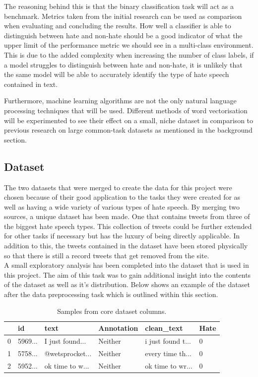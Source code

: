 \documentclass[conference]{IEEEtran}
\begin{document}
The reasoning behind this is that the binary classification task will act as a benchmark. Metrics taken from the initial research can be used as comparison when evaluating and concluding the results. How well a classifier is able to distinguish between hate and non-hate should be a good indicator of what the upper limit of the performance metric we should see in a multi-class environment. This is due to the added complexity when increasing the number of class labels, if a model struggles to distinguish between hate and non-hate, it is unlikely that the same model will be able to accurately identify the type of hate speech contained in text.

Furthermore, machine learning algorithms are not the only natural language processing techniques that will be used. Different methods of word vectorisation will be experimented to see their effect on a small, niche dataset in comparison to previous research on large common-task datasets as mentioned in the background section. 

\subsection{Dataset}
The two datasets that were merged to create the data for this project were chosen because of their good application to the tasks they were created for as well as having a wide variety of various types of hate speech. By merging two sources, a unique dataset has been made. One that contains tweets from three of the biggest hate speech types. This collection of tweets could be further extended for other tasks if necessary but has the luxury of being directly applicable. In addition to this, the tweets contained in the dataset have been stored physically so that there is still a record tweets that get removed from the site. \\

A small exploratory analysis has been completed into the dataset that is used in this project. The aim of this task was to gain additional insight into the contents of the dataset as well as it's distribution. Below shows an example of the dataset after the data preprocessing task which is outlined within this section.

\begin{table}[H]
\centering
\begin{tabular}{|l|l|l|l|l|l|}
\hline
{} & id & text & Annotation & clean\_text & Hate \\ \hline

0 & 5969... &  I just found... & Neither & i just found t... &  0 \\ \hline
1 & 5758... &  @wetsprocket... & Neither & every time th... & 0 \\ \hline
2 & 5952... &  ok time to w... & Neither & ok time to wr... & 0 \\ \hline
\end{tabular}
\caption{\label{tab:dataset-head}Samples from core dataset columns.}
\end{table}
\end{document}
